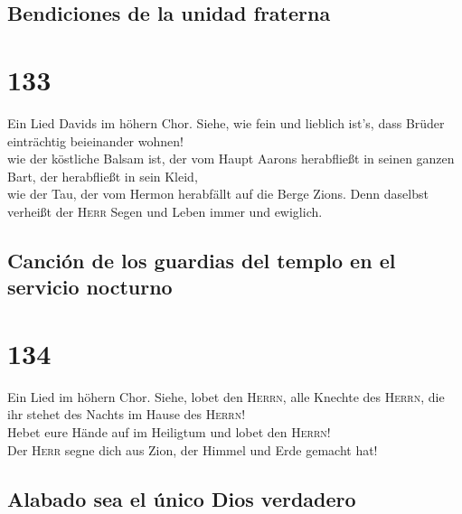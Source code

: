 \hypertarget{bendiciones-de-la-unidad-fraterna}{%
\subsection{Bendiciones de la unidad
fraterna}\label{bendiciones-de-la-unidad-fraterna}}

\hypertarget{section-132}{%
\section{133}\label{section-132}}

 Ein Lied Davids im höhern Chor. Siehe, wie fein und
lieblich ist's, dass Brüder einträchtig beieinander wohnen!\\
 wie der köstliche Balsam ist, der vom Haupt Aarons
herabfließt in seinen ganzen Bart, der herabfließt in sein Kleid,\\
 wie der Tau, der vom Hermon herabfällt auf die Berge
Zions. Denn daselbst verheißt der \textsc{Herr} Segen und Leben immer
und ewiglich.

\hypertarget{canciuxf3n-de-los-guardias-del-templo-en-el-servicio-nocturno}{%
\subsection{Canción de los guardias del templo en el servicio
nocturno}\label{canciuxf3n-de-los-guardias-del-templo-en-el-servicio-nocturno}}

\hypertarget{section-133}{%
\section{134}\label{section-133}}

 Ein Lied im höhern Chor. Siehe, lobet den \textsc{Herrn},
alle Knechte des \textsc{Herrn}, die ihr stehet des Nachts im Hause des
\textsc{Herrn}!\\
 Hebet eure Hände auf im Heiligtum und lobet den
\textsc{Herrn}!\\
 Der \textsc{Herr} segne dich aus Zion, der Himmel und
Erde gemacht hat!

\hypertarget{alabado-sea-el-uxfanico-dios-verdadero}{%
\subsection{Alabado sea el único Dios
verdadero}\label{alabado-sea-el-uxfanico-dios-verdadero}}

